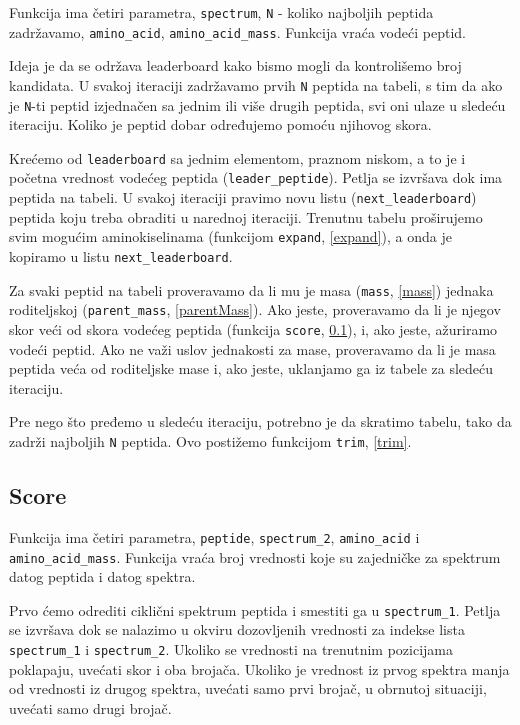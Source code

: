 Funkcija ima četiri parametra, \texttt{spectrum}, \texttt{N} - koliko najboljih peptida zadržavamo, \texttt{amino\_acid},  \texttt{amino\_acid\_mass}. Funkcija vraća vodeći peptid.

Ideja je da se održava leaderboard kako bismo mogli da kontrolišemo broj kandidata. U svakoj iteraciji zadržavamo prvih \texttt{N} peptida na tabeli, s tim da ako je \texttt{N}-ti peptid izjednačen sa jednim ili više drugih peptida, svi oni ulaze u sledeću iteraciju. Koliko je peptid dobar određujemo pomoću njihovog skora.

Krećemo od \texttt{leaderboard} sa jednim elementom, praznom niskom, a to je i početna vrednost vodećeg peptida (\texttt{leader\_peptide}). Petlja se izvršava dok ima peptida na tabeli. U svakoj iteraciji pravimo novu listu (\texttt{next\_leaderboard}) peptida koju treba obraditi u narednoj iteraciji. Trenutnu tabelu proširujemo svim mogućim aminokiselinama (funkcijom \texttt{expand}, \ref{expand}), a onda je kopiramo u listu \texttt{next\_leaderboard}. 

Za svaki peptid na tabeli proveravamo da li mu je masa (\texttt{mass}, \ref{mass}) jednaka roditeljskoj (\texttt{parent\_mass}, \ref{parentMass}). Ako jeste, proveravamo da li je njegov skor veći od skora vodećeg peptida (funkcija \texttt{score}, \ref{scoreCycle}), i, ako jeste, ažuriramo vodeći peptid. Ako ne važi uslov jednakosti za mase, proveravamo da li je masa peptida veća od roditeljske mase i, ako jeste, uklanjamo ga iz tabele za sledeću iteraciju.

Pre nego što pređemo u sledeću iteraciju, potrebno je da skratimo tabelu, tako da zadrži najboljih \texttt{N} peptida. Ovo postižemo funkcijom \texttt{trim}, \ref{trim}.




\subsection{Score}
\label{scoreCycle} 

Funkcija ima četiri parametra, \texttt{peptide}, \texttt{spectrum\_2}, \texttt{amino\_acid} i  \texttt{amino\_acid\_mass}. Funkcija vraća broj vrednosti koje su zajedničke za spektrum datog peptida i datog spektra.

Prvo ćemo odrediti ciklični spektrum peptida i smestiti ga u \texttt{spectrum\_1}. Petlja se izvršava dok se nalazimo u okviru dozovljenih vrednosti za indekse lista \texttt{spectrum\_1} i \texttt{spectrum\_2}. Ukoliko se vrednosti na trenutnim pozicijama poklapaju, uvećati skor i oba brojača. Ukoliko je vrednost iz prvog spektra manja od vrednosti iz drugog spektra, uvećati samo prvi brojač, u obrnutoj situaciji, uvećati samo drugi brojač.

